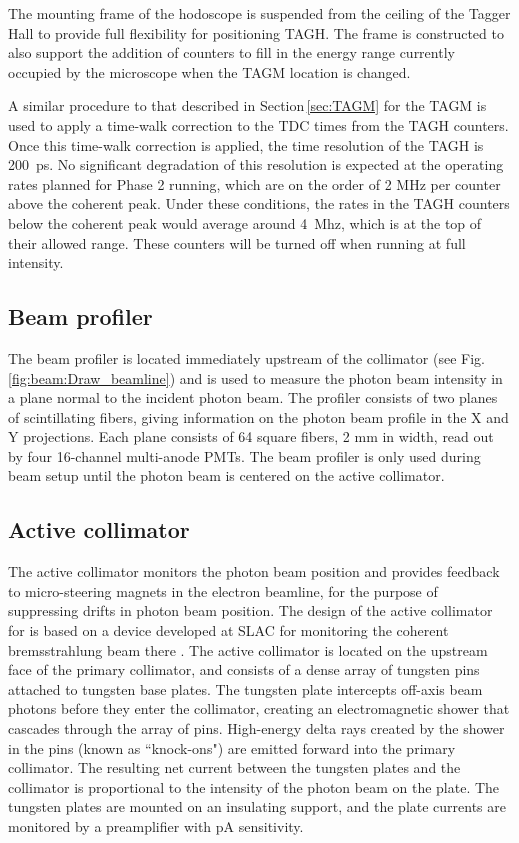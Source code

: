 The mounting frame of the hodoscope is suspended from the ceiling of the Tagger Hall
to provide full flexibility for positioning TAGH. The frame is constructed
to also support the addition of counters to fill in the energy range currently
occupied by the microscope when the TAGM location is changed.

A similar procedure to that described in Section\,\ref{sec:TAGM} for the TAGM is used to apply
a time-walk correction to the TDC times from the TAGH counters. Once this
time-walk correction
is applied, the time resolution of the TAGH is 200~ps. No significant
degradation of this resolution is expected at the operating rates planned
for Phase 2 running, which are on the order of 2 MHz per counter above
the coherent peak. Under these conditions, the rates in the TAGH counters
below the coherent peak would average around 4~Mhz, which is at the top
of their allowed range. These counters will be turned off when
running at full intensity.

\subsection{Beam profiler}
The beam profiler is located immediately upstream of the collimator (see Fig.\,\ref{fig:beam:Draw_beamline}) and is
used to measure the photon beam intensity in a plane normal to the incident
photon beam. The profiler consists of two planes
of scintillating fibers, giving information on the photon beam profile
in the X and Y projections. Each plane consists of 64 square fibers,
2 mm in width, read out by four 16-channel multi-anode PMTs. The beam profiler
is only used during beam setup until the photon beam is centered on the active collimator.

\subsection{Active collimator \label{sec:coll}}
The active collimator monitors the photon beam position and provides
feedback to micro-steering magnets in the electron beamline, for the
purpose of suppressing drifts in photon beam position. 
The
design of the active collimator for \GX{} is based on a device 
developed at SLAC for monitoring
the coherent bremsstrahlung beam there \cite{Miller:1973yi}.
The \GX{} active collimator is located on
the upstream face of the primary collimator, and consists of a dense
array of tungsten pins attached to tungsten base plates. The tungsten
plate intercepts off-axis beam photons before they enter the collimator,
creating an electromagnetic shower that cascades through the array
of pins. High-energy delta rays created by the
shower in the pins (known as ``knock-ons") 
are emitted forward into the primary collimator. The resulting net current between the tungsten plates and the collimator is proportional to the intensity of the photon beam on the plate.
The tungsten plates are mounted on an insulating support, and the plate
currents are monitored by a preamplifier with pA sensitivity. 

